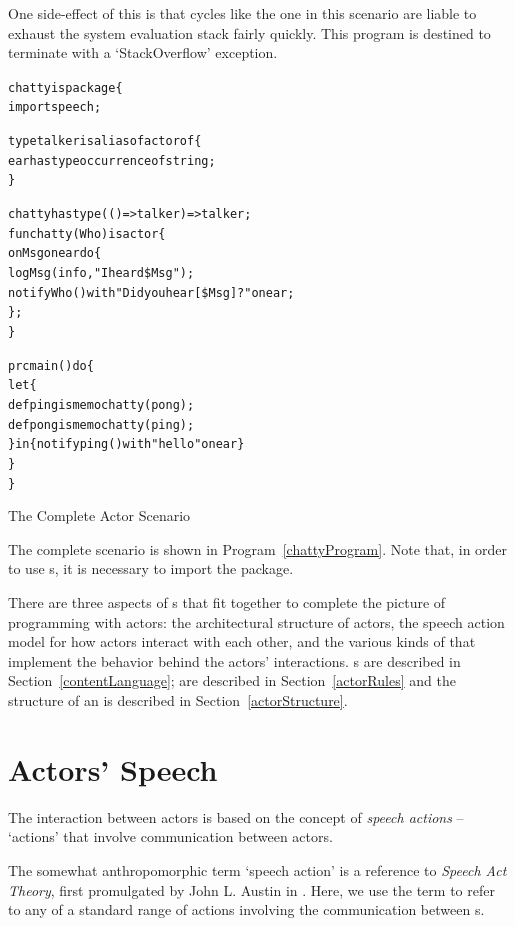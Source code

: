 \begin{aside}
One side-effect of this is that cycles like the one in this scenario are liable to exhaust the system evaluation stack fairly quickly. This program is destined to terminate with a `StackOverflow' exception.
\end{aside}

\begin{program}
\begin{alltt}
chatty is package\{
  import speech;
  
  type talker is alias of actor of \{
    ear has type occurrence of string;
  \}

  chatty has type (()=>talker)=>talker;
  fun chatty(Who) is actor\{
    on Msg on ear do\{
      logMsg(info,"I heard \$Msg");
      notify Who() with "Did you hear [\$Msg]?" on ear;
    \};
  \}
  
  prc main() do \{
    let\{
      def ping is memo chatty(pong);
      def pong is memo chatty(ping);
    \} in \{ notify ping() with "hello" on ear \}
  \}
\}
\end{alltt}
\caption{The Complete  Actor Scenario}
\label{chattyProgram}
\end{program}
The complete scenario is shown in Program~\vref{chattyProgram}. Note that, in order to use s, it is necessary to import the  package.

There are three aspects of s that fit together to complete the picture of programming with actors: the architectural structure of actors, the speech action model for how actors interact with each other, and the various kinds of  that implement the behavior behind the actors' interactions. s are described in Section~\vref{contentLanguage};  are described in Section~\vref{actorRules} and the structure of an  is described in Section~\vref{actorStructure}.

\section{Actors' Speech}
\label{contentLanguage}

The interaction between actors is based on the concept of \emph{speech actions} -- `actions' that involve communication between actors.

\begin{aside}
The somewhat anthropomorphic term `speech action' is a reference to \emph{Speech Act Theory}, first promulgated by John L. Austin in \cite{austin:60}. Here, we use the term to refer to any of a standard range of actions involving the communication between s.
\end{aside}

